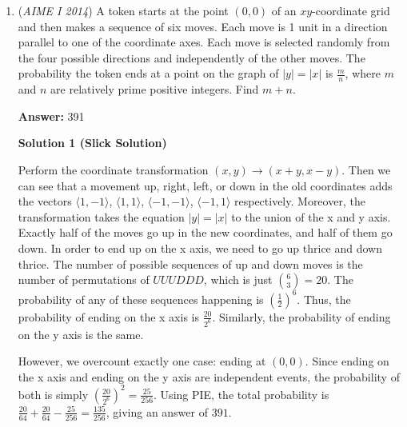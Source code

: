 \begin{enumerate}
 



\textbf{Solution 3}

We could use coordbash to solve this problem.Assume that $E$ is the origin, and $E, A, C$ are collinear points on the x-axis. Then it's trivial to see that $D=(6\cos(60^\circ),6\sin(60^\circ))$, and since $BD$ is parallel to $AC$, $B=(6\cos(60^\circ)-1,6\sin(60^\circ))$. After simplifying, we get $B=(2,3\sqrt{3})$.

 Assume there is a point $F$ such that $F=(0, 3\sqrt{3})$. Then $BF$ is parallel to $EA$, meaning $\angle FBE=\angle BEA$. $\sin(\angle FBE)$ is just $\frac{BF}{BE}=\frac{3\sqrt{3}}{\sqrt{31}}$, and squaring the fraction gives us the answer $\frac{27}{31}=\boxed{058}$.

 -Marchk26

 


	\item (\textit{AIME I 2014}) A token starts at the point $(0,0)$ of an $xy$-coordinate grid and then makes a sequence of six moves. Each move is 1 unit in a direction parallel to one of the coordinate axes. Each move is selected randomly from the four possible directions and independently of the other moves. The probability the token ends at a point on the graph of $|y|=|x|$ is $\frac{m}{n}$, where $m$ and $n$ are relatively prime positive integers. Find $m+n$.


 
 \textbf{Answer: }391



\textbf{Solution 1 (Slick Solution)}

Perform the coordinate transformation $(x, y)\rightarrow (x+y, x-y)$. Then we can see that a movement up, right, left, or down in the old coordinates adds the vectors $\langle 1, -1 \rangle$, $\langle 1, 1 \rangle$, $\langle -1, -1 \rangle$, $\langle -1, 1 \rangle$ respectively. Moreover, the transformation takes the equation $|y| = |x|$ to the union of the x and y axis. Exactly half of the moves go up in the new coordinates, and half of them go down. In order to end up on the x axis, we need to go up thrice and down thrice. The number of possible sequences of up and down moves is the number of permutations of $UUUDDD$, which is just $\binom63 = 20$. The probability of any of these sequences happening is $\left(\frac12\right)^6$. Thus, the probability of ending on the x axis is $\frac{20}{2^6}$. Similarly, the probability of ending on the y axis is the same. 

 However, we overcount exactly one case: ending at $(0, 0)$. Since ending on the x axis and ending on the y axis are independent events, the probability of both is simply $\left(\frac{20}{2^6}\right)^2 = \frac{25}{256}$. Using PIE, the total probability is $\frac{20}{64} + \frac{20}{64} - \frac{25}{256} = \frac{135}{256}$, giving an answer of $\boxed{391}$.


\end{enumerate}
